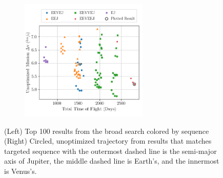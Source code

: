 \documentclass[letterpaper, paper,11pt]{AAS}	%
\begin{document}
\begin{figure}[!ht]
    \centering
    \begin{subfigure}
        \centering\includegraphics[width=2.4in]{./fig/clipperResults.png}
    \end{subfigure}
    \begin{subfigure}
        \centering
    \end{subfigure}
    \setlength{\belowcaptionskip}{-10pt}
    \caption{(Left) Top 100 results from the broad search colored by sequence\hspace{1em} (Right) Circled, unoptimized trajectory from results that matches targeted sequence \cite{Buffington2014} with the outermost dashed line is the semi-major axis of Jupiter, the middle dashed line is Earth's, and the innermost is Venus's.}
    \label{fig:clipResults}
\end{figure}
\end{document}
